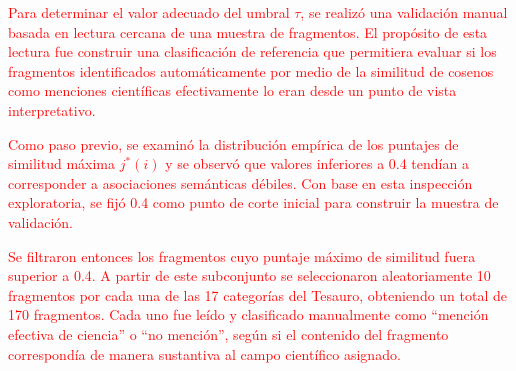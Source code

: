 \documentclass[11pt,a4paper]{article}
\begin{document}
	
%	
%	
%	

\textcolor{red}{Para determinar el valor adecuado del umbral $\tau$, se realizó una validación manual basada en lectura cercana de una muestra de fragmentos. El propósito de esta lectura fue construir una clasificación de referencia que permitiera evaluar si los fragmentos identificados automáticamente por medio de la similitud de cosenos como menciones científicas efectivamente lo eran desde un punto de vista interpretativo.}

\textcolor{red}{Como paso previo, se examinó la distribución empírica de los puntajes de similitud máxima $j^*(i)$ y se observó que valores inferiores a 0.4 tendían a corresponder a asociaciones semánticas débiles. Con base en esta inspección exploratoria, se fijó 0.4 como punto de corte inicial para construir la muestra de validación.}

\textcolor{red}{Se filtraron entonces los fragmentos cuyo puntaje máximo de similitud fuera superior a 0.4. A partir de este subconjunto se seleccionaron aleatoriamente 10 fragmentos por cada una de las 17 categorías del Tesauro, obteniendo un total de 170 fragmentos. Cada uno fue leído y clasificado manualmente como “mención efectiva de ciencia” o “no mención”, según si el contenido del fragmento correspondía de manera sustantiva al campo científico asignado.}
\end{document}
